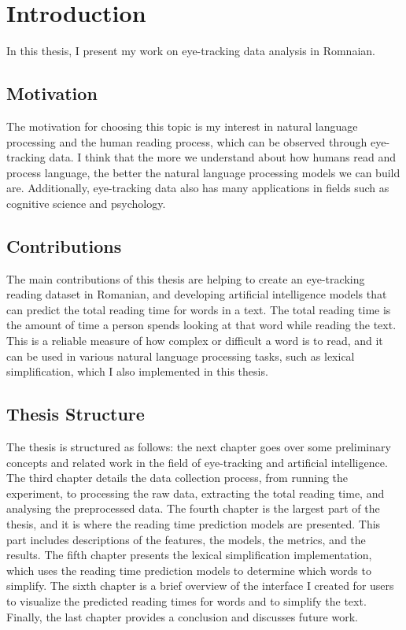\chapter{Introduction}
In this thesis, I present my work on eye-tracking data analysis in Romnaian.

\section{Motivation}
The motivation for choosing this topic is my interest in natural language processing and the human reading process, which can be observed through eye-tracking data. I think that the more we understand about how humans read and process language, the better the natural language processing models we can build are. Additionally, eye-tracking data also has many applications in fields such as cognitive science and psychology.

\section{Contributions}
The main contributions of this thesis are helping to create an eye-tracking reading dataset in Romanian, and developing artificial intelligence models that can predict the total reading time for words in a text. The total reading time is the amount of time a person spends looking at that word while reading the text. This is a reliable measure of how complex or difficult a word is to read, and it can be used in various natural language processing tasks, such as lexical simplification, which I also implemented in this thesis.

\section{Thesis Structure}
The thesis is structured as follows: the next chapter goes over some preliminary concepts and related work in the field of eye-tracking and artificial intelligence. The third chapter details the data collection process, from running the experiment, to processing the raw data, extracting the total reading time, and analysing the preprocessed data. The fourth chapter is the largest part of the thesis, and it is where the reading time prediction models are presented. This part includes descriptions of the features, the models, the metrics, and the results. The fifth chapter presents the lexical simplification implementation, which uses the reading time prediction models to determine which words to simplify. The sixth chapter is a brief overview of the interface I created for users to visualize the predicted reading times for words and to simplify the text. Finally, the last chapter provides a conclusion and discusses future work.